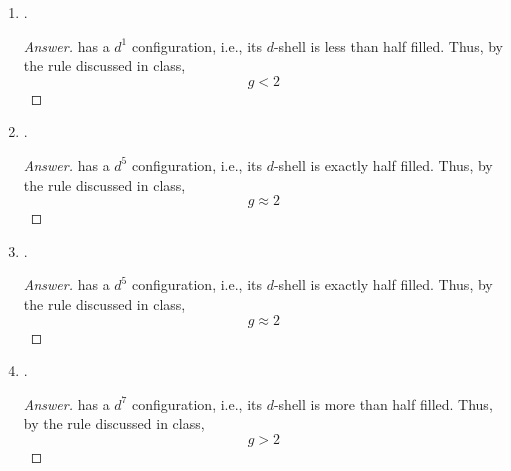 \documentclass[../psets.tex]{subfiles}
\begin{document}
\begin{enumerate}
\begin{enumerate}
\begin{proof}[Answer]
             has a $d^9$ configuration, i.e., its $d$-shell is more than half filled. Thus, by the rule discussed in class,
            \begin{equation*}
                \boxed{g > 2}
            \end{equation*}
            The intuitive (but not quantum mechanically accurate) reason for this is that in a $d^9$ configuration, one \emph{hole} hops around producing a ring current that \emph{reinforces} the magnetic field, which means that we don't need $H_r$ to be as high in $g=h\nu/\beta H_r$ to achieve the transition. With $H_r$ lower, $g$ is higher.
        \end{proof}
        \item {}.
        \begin{proof}[Answer]
             has a $d^1$ configuration, i.e., its $d$-shell is less than half filled. Thus, by the rule discussed in class,
            \begin{equation*}
                \boxed{g < 2}
            \end{equation*}
        \end{proof}
        \pagebreak
        \item {}.
        \begin{proof}[Answer]
             has a $d^5$ configuration, i.e., its $d$-shell is exactly half filled. Thus, by the rule discussed in class,
            \begin{equation*}
                \boxed{g \approx 2}
            \end{equation*}
        \end{proof}
        \item {}.
        \begin{proof}[Answer]
             has a $d^5$ configuration, i.e., its $d$-shell is exactly half filled. Thus, by the rule discussed in class,
            \begin{equation*}
                \boxed{g \approx 2}
            \end{equation*}
        \end{proof}
        \item {}.
        \begin{proof}[Answer]
             has a $d^7$ configuration, i.e., its $d$-shell is more than half filled. Thus, by the rule discussed in class,
            \begin{equation*}
                \boxed{g > 2}

\end{equation*}
\end{proof}
\end{enumerate}
\end{enumerate}
\end{document}
